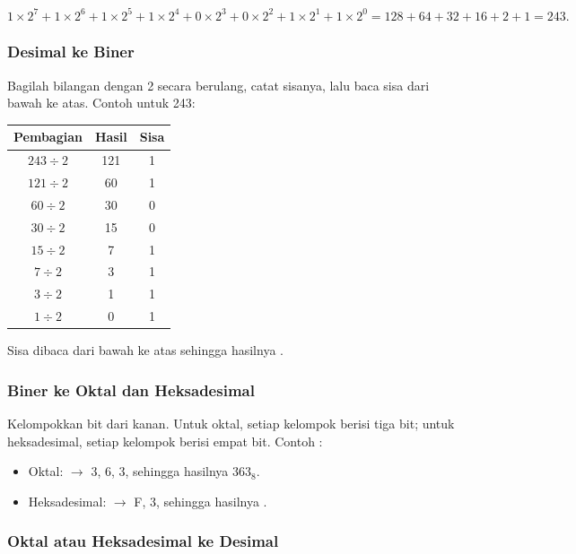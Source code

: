 \[
    1 \times 2^7 + 1 \times 2^6 + 1 \times 2^5 + 1 \times 2^4
    + 0 \times 2^3 + 0 \times 2^2 + 1 \times 2^1 + 1 \times 2^0
    = 128 + 64 + 32 + 16 + 2 + 1 = 243.
\]

\subsubsection{Desimal ke Biner}

Bagilah bilangan dengan 2 secara berulang, catat sisanya, lalu baca
sisa dari bawah ke atas. Contoh untuk 243:

\begin{center}
\begin{tabular}{@{}ccc@{}}
    \toprule
    \textbf{Pembagian} & \textbf{Hasil} & \textbf{Sisa} \\
    \midrule
    $243 \div 2$ & 121 & 1 \\
    $121 \div 2$ & 60 & 1 \\
    $60 \div 2$ & 30 & 0 \\
    $30 \div 2$ & 15 & 0 \\
    $15 \div 2$ & 7 & 1 \\
    $7 \div 2$ & 3 & 1 \\
    $3 \div 2$ & 1 & 1 \\
    $1 \div 2$ & 0 & 1 \\
    \bottomrule
\end{tabular}
\end{center}

Sisa dibaca dari bawah ke atas sehingga hasilnya .

\subsubsection{Biner ke Oktal dan Heksadesimal}

Kelompokkan bit dari kanan. Untuk oktal, setiap kelompok berisi tiga
bit; untuk heksadesimal, setiap kelompok berisi empat bit. Contoh
:

\begin{itemize}
    \item Oktal:    $\rightarrow$
          3, 6, 3, sehingga hasilnya $363_8$.
    \item Heksadesimal:   $\rightarrow$
          F, 3, sehingga hasilnya .
\end{itemize}

\subsubsection{Oktal atau Heksadesimal ke Desimal}

